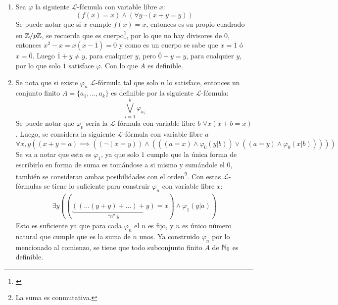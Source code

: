 \begin{sol}
    \begin{enumerate}[label=(\alph*)]
        \item Sea \(\varphi\) la siguiente \(\mathcal{L}\)-fórmula con variable libre \(x\):
              \[(f(x)=x)\wedge(\forall y\neg(x+y=y))\]
              Se puede notar que si \(x\) cumple \(f(x)=x\), entonces es su propio cuadrado en \(\mathbb{Z}/p\mathbb{Z}\), se recuerda que es cuerpo\footnote{\cite{artin2011algebra}}, por lo que no hay divisores de \(0\), entonces \(x^2-x=x(x-\overline{1})=0\) y como es un cuerpo se sabe que \(x=\overline{1}\) ó \(x=\overline{0}\). Luego \(\overline{1}+y\neq y\), para cualquier \(y\), pero \(\overline{0}+y=y\), para cualquier \(y\), por lo que solo \(\overline{1}\) satisface \(\varphi\). Con lo que \(A\) es definible.
        \item Se nota que si existe \(\varphi_n\) \(\mathcal{L}\)-fórmula tal que solo \(n\) lo satisface, entonces un conjunto finito \(A=\{a_1,...,a_k\}\) es definible por la siguiente \(\mathcal{L}\)-fórmula:
              \[
                  \bigvee_{i=1}^k\varphi_{a_i}
              \]
              Se puede notar que \(\varphi_0\) sería la \(\mathcal{L}\)-fórmula  con variable libre \(b\) \(\forall x (x+b=x)\). Luego, se considera la siguiente \(\mathcal{L}\)-fórmula con variable libre \(a\)
              \[
                  \forall x,y ((x+y=a)\implies((\neg(x=y))\wedge(((a=x)\wedge\varphi_0(y|b))\vee((a=y)\wedge\varphi_0(x|b)))))
              \]
              Se va a notar que esta es \(\varphi_1\), ya que solo \(1\) cumple que la única forma de escribirlo en forma de suma es tomándose a si mismo y sumándole el \(0\), también se consideran ambas posibilidades con el orden\footnote{La suma es conmutativa.}. %
              Con estas \(\mathcal{L}\)-fórmulas se tiene lo suficiente para construir \(\varphi_n\) con variable libre \(x\):
              \begin{align*}
                  \exists y ((\underbrace{((\dots(y+y)+\dots)+y)}_{\text{``\(n\)'' \(y\)}}=x)\wedge \varphi_1(y|a))
              \end{align*}
              Esto es suficiente ya que para cada \(\varphi_n\) el \(n\) es fijo, y \(n\) es único número natural que cumple que es la suma de \(n\) unos. Ya construido \(\varphi_n\) por lo mencionado al comienzo, se tiene que todo subconjunto finito \(A\) de \(\mathbb{N}_0\) es definible.
    \end{enumerate}
\end{sol}

